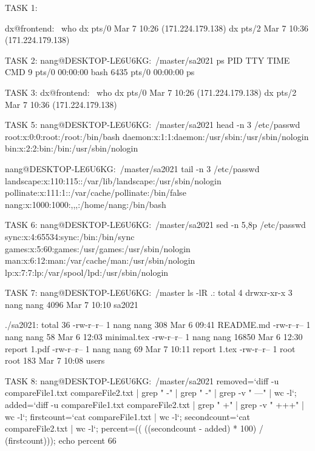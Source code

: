 \documentclass{article}
\begin{document}
TASK 1:

dx@frontend:~ who
dx       pts/0        Mar  7 10:26 (171.224.179.138)
dx       pts/2        Mar  7 10:36 (171.224.179.138)

TASK 2:
nang@DESKTOP-LE6U6KG:~/master/sa2021 ps
  PID TTY          TIME CMD
    9 pts/0    00:00:00 bash
 6435 pts/0    00:00:00 ps

TASK 3:
dx@frontend:~ who
dx       pts/0        Mar  7 10:26 (171.224.179.138)
dx       pts/2        Mar  7 10:36 (171.224.179.138)


TASK 5:
nang@DESKTOP-LE6U6KG:~/master/sa2021 head -n 3 /etc/passwd
root:x:0:0:root:/root:/bin/bash
daemon:x:1:1:daemon:/usr/sbin:/usr/sbin/nologin
bin:x:2:2:bin:/bin:/usr/sbin/nologin

nang@DESKTOP-LE6U6KG:~/master/sa2021 tail -n 3 /etc/passwd
landscape:x:110:115::/var/lib/landscape:/usr/sbin/nologin
pollinate:x:111:1::/var/cache/pollinate:/bin/false
nang:x:1000:1000:,,,:/home/nang:/bin/bash

TASK 6: 
nang@DESKTOP-LE6U6KG:~/master/sa2021  sed -n 5,8p /etc/passwd
sync:x:4:65534:sync:/bin:/bin/sync
games:x:5:60:games:/usr/games:/usr/sbin/nologin
man:x:6:12:man:/var/cache/man:/usr/sbin/nologin
lp:x:7:7:lp:/var/spool/lpd:/usr/sbin/nologin

TASK 7:
nang@DESKTOP-LE6U6KG:~/master ls -lR
.:
total 4
drwxr-xr-x 3 nang nang 4096 Mar  7 10:10 sa2021

./sa2021:
total 36
-rw-r--r-- 1 nang nang   308 Mar  6 09:41 README.md
-rw-r--r-- 1 nang nang    58 Mar  6 12:03 minimal.tex
-rw-r--r-- 1 nang nang 16850 Mar  6 12:30 report 1.pdf
-rw-r--r-- 1 nang nang    69 Mar  7 10:11 report 1.tex
-rw-r--r-- 1 root root   183 Mar  7 10:08 users

TASK 8:
nang@DESKTOP-LE6U6KG:~/master/sa2021 removed=`diff -u compareFile1.txt compareFile2.txt | grep " -" | grep " -" | grep -v " ---" | wc -l`; added=`diff -u compareFile1.txt compareFile2.txt | grep " +" | grep -v " +++" | wc -l`; firstcount=`cat compareFile1.txt | wc -l`; secondcount=`cat compareFile2.txt | wc -l`; percent=(( ((secondcount - added) * 100) / (firstcount))); echo percent
66
\end{document}
